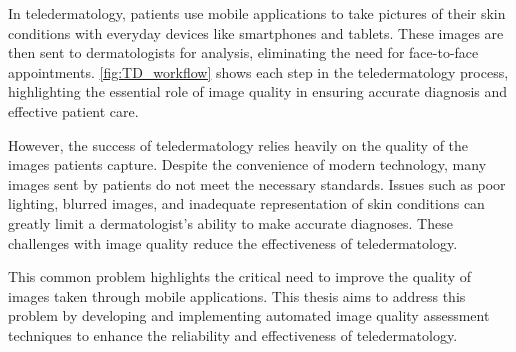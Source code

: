 \noindent
In teledermatology, patients use mobile applications to take pictures of their skin conditions with everyday devices like smartphones and tablets. These images are then sent to dermatologists for analysis, eliminating the need for face-to-face appointments. \autoref{fig:TD_workflow} shows each step in the teledermatology process, highlighting the essential role of image quality in ensuring accurate diagnosis and effective patient care. \par
\vspace{\baselineskip}
\noindent
However, the success of teledermatology relies heavily on the quality of the images patients capture. Despite the convenience of modern technology, many images sent by patients do not meet the necessary standards. Issues such as poor lighting, blurred images, and inadequate representation of skin conditions can greatly limit a dermatologist’s ability to make accurate diagnoses. These challenges with image quality reduce the effectiveness of teledermatology. \par
\vspace{\baselineskip}
\noindent
This common problem highlights the critical need to improve the quality of images taken through mobile applications. This thesis aims to address this problem by developing and implementing automated image quality assessment techniques to enhance the reliability and effectiveness of teledermatology. \par 


